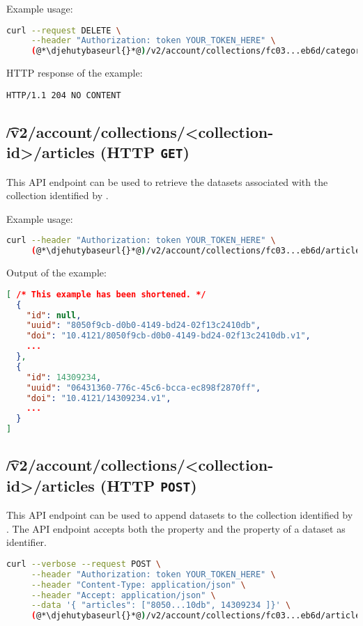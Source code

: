   Example usage:
\begin{lstlisting}[language=bash]
curl --request DELETE \
     --header "Authorization: token YOUR_TOKEN_HERE" \
     (@*\djehutybaseurl{}*@)/v2/account/collections/fc03...eb6d/categories/13558
\end{lstlisting}

  HTTP response of the example:
\begin{lstlisting}
HTTP/1.1 204 NO CONTENT
\end{lstlisting}

\subsection{\t{/v2/account/collections/<collection-id>/articles} (HTTP \texttt{GET})}

  This API endpoint can be used to retrieve the datasets associated with
  the collection identified by .

  Example usage:
\begin{lstlisting}[language=bash]
curl --header "Authorization: token YOUR_TOKEN_HERE" \
     (@*\djehutybaseurl{}*@)/v2/account/collections/fc03...eb6d/articles | jq
\end{lstlisting}

  Output of the example:
\begin{lstlisting}[language=JSON]
[ /* This example has been shortened. */
  {
    "id": null,
    "uuid": "8050f9cb-d0b0-4149-bd24-02f13c2410db",
    "doi": "10.4121/8050f9cb-d0b0-4149-bd24-02f13c2410db.v1",
    ...
  },
  {
    "id": 14309234,
    "uuid": "06431360-776c-45c6-bcca-ec898f2870ff",
    "doi": "10.4121/14309234.v1",
    ...
  }
]
\end{lstlisting}

\subsection{\t{/v2/account/collections/<collection-id>/articles} (HTTP \texttt{POST})}
\label{sec:v2-account-collection-articles}
  This API endpoint can be used to append datasets to the collection identified
  by \code{collection-id}.  The API endpoint accepts both the \code{id} property
  and the \code{uuid} property of a dataset as identifier.

\begin{lstlisting}[language=bash]
curl --verbose --request POST \
     --header "Authorization: token YOUR_TOKEN_HERE" \
     --header "Content-Type: application/json" \
     --header "Accept: application/json" \
     --data '{ "articles": ["8050...10db", 14309234 ]}' \
     (@*\djehutybaseurl{}*@)/v2/account/collections/fc03...eb6d/articles
\end{lstlisting}

